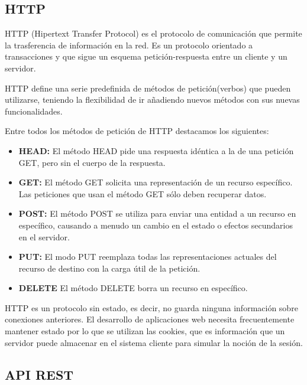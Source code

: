 \subsection*{HTTP}
HTTP (Hipertext Transfer Protocol) es el protocolo de comunicación que permite la trasferencia de información en la red. Es un protocolo orientado a transacciones y que sigue un esquema petición-respuesta entre un cliente y un servidor.

HTTP define una serie predefinida de métodos de petición(verbos) que pueden utilizarse, teniendo la flexibilidad de ir añadiendo nuevos métodos con sus nuevas funcionalidades.

Entre todos los métodos de petición de HTTP destacamos los siguientes:
\begin{itemize}
    \item \textbf {HEAD:} El método HEAD pide una respuesta idéntica a la de una petición GET, pero sin el cuerpo de la respuesta.
    \item \textbf {GET:} El método GET  solicita una representación de un recurso específico. Las peticiones que usan el método GET sólo deben recuperar datos.
    \item \textbf {POST:} El método POST se utiliza para enviar una entidad a un recurso en específico, causando a menudo un cambio en el estado o efectos secundarios en el servidor.
    \item \textbf {PUT:} El modo PUT reemplaza todas las representaciones actuales del recurso de destino con la carga útil de la petición.
    \item \textbf {DELETE} El método DELETE borra un recurso en específico.
\end{itemize}

HTTP es un protocolo sin estado, es decir, no guarda ninguna información sobre conexiones anteriores. El desarrollo de aplicaciones web necesita frecuentemente mantener estado por lo que se utilizan las cookies, que es información que un servidor puede almacenar en el sistema cliente para simular la noción de la sesión.

\subsection*{API REST}

